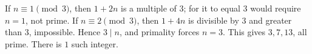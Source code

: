 If $n\equiv1\pmod3$, then $1+2n$ is a multiple of $3$; for it to equal $3$ would require $n=1$, not prime. If $n\equiv2\pmod3$, then $1+4n$ is divisible by $3$ and greater than $3$, impossible. Hence $3\mid n$, and primality forces $n=3$. This gives $3,7,13$, all prime. There is $\boxed1$ such integer.
